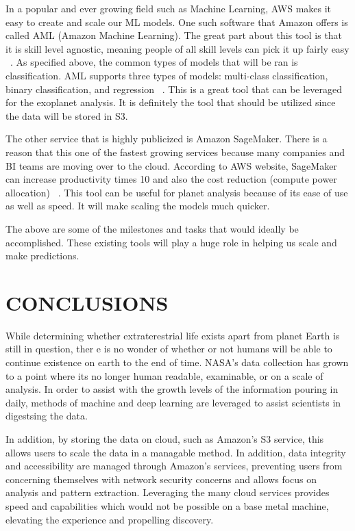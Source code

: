 \documentclass[letterpaper, 10 pt, conference]{ieeeconf}  %
\begin{document}
In a popular and ever growing field such as Machine Learning, AWS makes it easy to create and scale our ML models. One such software that Amazon offers is called AML (Amazon Machine Learning). The great part about this tool is that it is skill level agnostic, meaning people of all skill levels can pick it up fairly easy ~\cite{PopularMLSoftware}. As specified above, the common types of models that will be ran is classification. AML supports three types of models: multi-class classification, binary classification, and regression ~\cite{PopularMLSoftware}. This is a great tool that can be leveraged for the exoplanet analysis. It is definitely the tool that should be utilized since the data will be stored in S3.

The other service that is highly publicized is Amazon SageMaker. There is a reason that this one of the fastest growing services because many companies and BI teams are moving over to the cloud. According to AWS website, SageMaker can increase productivity times 10 and also the cost reduction (compute power allocation) ~\cite{AmazonSagemaker}. This tool can be useful for planet analysis because of its ease of use as well as speed. It will make scaling the models much quicker. 

The above are some of the milestones and tasks that would ideally be accomplished. These existing tools will play a huge role in helping us scale and make predictions.

\section{CONCLUSIONS}

While determining whether extraterestrial life exists apart from planet Earth is still in question, ther e is no wonder of whether or not humans will be able to continue existence on earth to the end of time. NASA's data collection has grown to a point where its no longer human readable, examinable, or on a scale of analysis. In order to assist with the growth levels of the information pouring in daily, methods of machine and deep learning are leveraged to assist scientists in digestsing the data. 

In addition, by storing the data on cloud, such as Amazon's S3 service, this allows users to scale the data in a managable method. In addition, data integrity and accessibility are managed through Amazon's services, preventing users from concerning themselves with network security concerns and allows focus on analysis and pattern extraction. Leveraging the many cloud services provides speed and capabilities which would not be possible on a base metal machine, elevating the experience and propelling discovery. 
\end{document}
